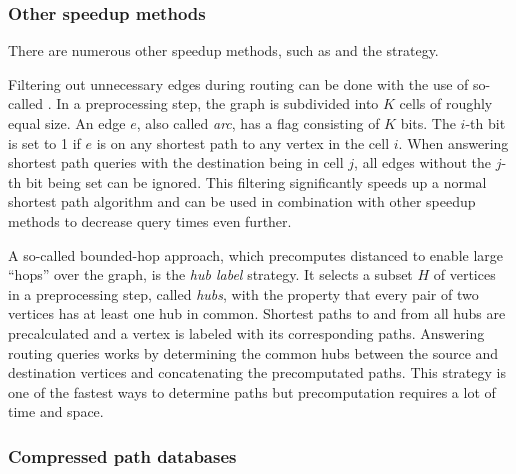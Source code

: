 		\subsubsection{Other speedup methods}
		\label{subsubsec:other-speedup-methods}
		
			There are numerous other speedup methods, such as  and the  strategy.
			
			Filtering out unnecessary edges during routing can be done with the use of so-called \cite{bast-transportation-networks}.
			In a preprocessing step, the graph is subdivided into $K$ cells of roughly equal size.
			An edge $e$, also called \emph{arc}, has a flag consisting of $K$ bits.
			The $i$-th bit is set to 1 if $e$ is on any shortest path to any vertex in the cell $i$.
			When answering shortest path queries with the destination being in cell $j$, all edges without the $j$-th bit being set can be ignored.
			This filtering significantly speeds up a normal shortest path algorithm and can be used in combination with other speedup methods to decrease query times even further.
			
			A so-called bounded-hop approach, which precomputes distanced to enable large \enquote{hops} over the graph, is the \emph{hub label} strategy\cite{bast-transportation-networks}.
			It selects a subset $H$ of vertices in a preprocessing step, called \emph{hubs}, with the property that every pair of two vertices has at least one hub in common.
			Shortest paths to and from all hubs are precalculated and a vertex is labeled with its corresponding paths.
			Answering routing queries works by determining the common hubs between the source and destination vertices and concatenating the precomputated paths.
			This strategy is one of the fastest ways to determine paths but precomputation requires a lot of time and space.
		
		\subsubsection{Compressed path databases}
		\label{subsubsec:cpd}
		
